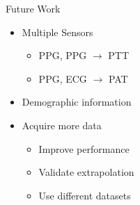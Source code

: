 \begin{frame}{Future Work}
    \begin{itemize}
        \item Multiple Sensors
              \begin{itemize}
                  \item PPG, PPG $\to$ PTT
                  \item PPG, ECG $\to$ PAT
              \end{itemize}
        \item Demographic information
        \item Acquire more data
              \begin{itemize}
                  \item Improve performance
                  \item Validate extrapolation
                  \item Use different datasets
              \end{itemize}
    \end{itemize}
\end{frame}